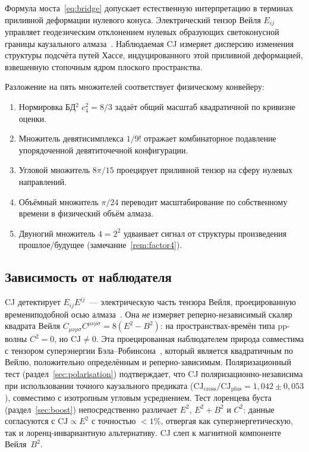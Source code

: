 \documentclass[12pt,a4paper]{article}
\theoremstyle{plain}
\theoremstyle{definition}
\theoremstyle{remark}
\newcommand{\Esq}{E_{ij}E^{ij}}
\newcommand{\CJ}{\mathrm{CJ}}
\begin{document}
Формула моста~\eqref{eq:bridge} допускает естественную
интерпретацию в терминах приливной деформации нулевого
конуса.  Электрический тензор Вейля $E_{ij}$ управляет
геодезическим отклонением нулевых образующих
светоконусной границы каузального
алмаза~\cite{Poisson:2011}.  Наблюдаемая CJ измеряет
дисперсию изменения структуры подсчёта путей Хассе,
индуцированного этой приливной деформацией, взвешенную
стопочным ядром плоского пространства.

Разложение на пять множителей соответствует физическому
конвейеру:
\begin{enumerate}
\item Нормировка БД${}^2$ $c_4^2 = 8/3$ задаёт общий
  масштаб квадратичной по кривизне оценки.
\item Множитель девятисимплекса $1/9!$ отражает
  комбинаторное подавление упорядоченной
  девятиточечной конфигурации.
\item Угловой множитель $8\pi/15$ проецирует приливной
  тензор на сферу нулевых направлений.
\item Объёмный множитель $\pi/24$ переводит масштабирование
  по собственному времени в физический объём алмаза.
\item Двуногий множитель $4 = 2^2$ удваивает сигнал от
  структуры произведения прошлое/будущее
  (замечание~\ref{rem:factor4}).
\end{enumerate}

\subsection{Зависимость от наблюдателя}

CJ детектирует $\Esq$~--- электрическую часть тензора
Вейля, проецированную времениподобной осью
алмаза~\cite{Ehlers:1961,PenroseRindler:1984}.  Она
\emph{не} измеряет реперно-независимый скаляр квадрата
Вейля
$C_{\mu\nu\rho\sigma}C^{\mu\nu\rho\sigma} = 8(E^2 - B^2)$:
на пространствах-времён типа pp-волны $C^2 = 0$, но
$\CJ \neq 0$.  Эта проецированная наблюдателем природа
совместима с тензором суперэнергии
Бэла--Робинсона~\cite{Senovilla:2000}, который является
квадратичным по Вейлю, положительно определённым и
реперно-зависимым.  Поляризационный тест
(раздел~\ref{sec:polarisation}) подтверждает, что CJ
поляризационно-независима при использовании точного
каузального предиката
($\CJ_{\mathrm{cross}}/\CJ_{\mathrm{plus}}
= 1{,}042 \pm 0{,}053$), совместимо с изотропным угловым
усреднением.  Тест лоренцева буста (раздел~\ref{sec:boost})
непосредственно различает $E^2$, $E^2 + B^2$ и $C^2$: данные
согласуются с $\CJ \propto E^2$ с точностью $< 1\%$,
отвергая как суперэнергетическую, так и
лоренц-инвариантную альтернативу.  CJ слеп к магнитной
компоненте Вейля~$B^2$.
\end{document}
